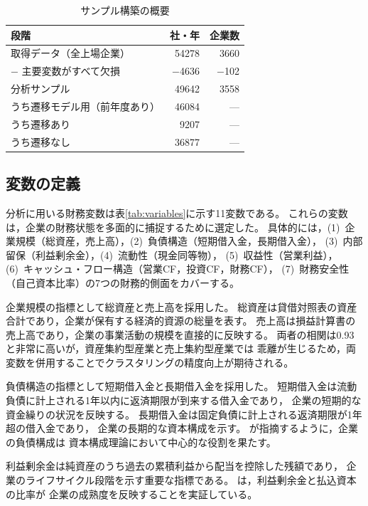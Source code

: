 \begin{table}[htbp]
  \centering
  \caption{サンプル構築の概要}
  \label{tab:sample-flow}
  \begin{tabular}{lrr}
    \toprule
    段階 & 社・年 & 企業数 \\
    \midrule
    取得データ（全上場企業） & \num{54278} & \num{3660} \\
    $-$ 主要変数がすべて欠損 & $-$\num{4636} & $-$102 \\
    \midrule
    分析サンプル & \num{49642} & \num{3558} \\
    \quad うち遷移モデル用（前年度あり） & \num{46084} & --- \\
    \quad\quad うち遷移あり & \num{9207} & --- \\
    \quad\quad うち遷移なし & \num{36877} & --- \\
    \bottomrule
  \end{tabular}
\end{table}

\subsection{変数の定義}

分析に用いる財務変数は表\ref{tab:variables}に示す11変数である。
これらの変数は，企業の財務状態を多面的に捕捉するために選定した。
具体的には，(1)~企業規模（総資産，売上高），(2)~負債構造（短期借入金，長期借入金），
(3)~内部留保（利益剰余金），(4)~流動性（現金同等物），
(5)~収益性（営業利益），(6)~キャッシュ・フロー構造（営業CF，投資CF，財務CF），
(7)~財務安全性（自己資本比率）の7つの財務的側面をカバーする。

企業規模の指標として総資産と売上高を採用した。
総資産は貸借対照表の資産合計であり，企業が保有する経済的資源の総量を表す。
売上高は損益計算書の売上高であり，企業の事業活動の規模を直接的に反映する。
両者の相関は0.93と非常に高いが，資産集約型産業と売上集約型産業では
乖離が生じるため，両変数を併用することでクラスタリングの精度向上が期待される。

負債構造の指標として短期借入金と長期借入金を採用した。
短期借入金は流動負債に計上される1年以内に返済期限が到来する借入金であり，
企業の短期的な資金繰りの状況を反映する。
長期借入金は固定負債に計上される返済期限が1年超の借入金であり，
企業の長期的な資本構成を示す。
が指摘するように，企業の負債構成は
資本構成理論において中心的な役割を果たす。

利益剰余金は純資産のうち過去の累積利益から配当を控除した残額であり，
企業のライフサイクル段階を示す重要な指標である。
は，利益剰余金と払込資本の比率が
企業の成熟度を反映することを実証している。

